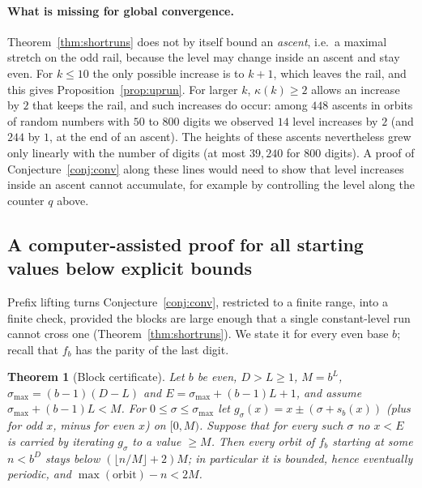 \documentclass[11pt]{article}
\newtheorem{theorem}{Theorem}[section]
\theoremstyle{definition}
\theoremstyle{remark}
\begin{document}
\paragraph{What is missing for global convergence.} Theorem~\ref{thm:shortruns}
does not by itself bound an \emph{ascent}, i.e.\ a maximal stretch on the odd
rail, because the level may change inside an ascent and stay even. For
$k\le10$ the only possible increase is to $k+1$, which leaves the rail, and
this gives Proposition~\ref{prop:uprun}. For larger $k$, $\kappa(k)\ge2$ allows
an increase by $2$ that keeps the rail, and such increases do occur: among
$448$ ascents in orbits of random numbers with $50$ to $800$ digits we
observed $14$ level increases by $2$ (and $244$ by $1$, at the end of an
ascent). The heights of these ascents nevertheless grew only linearly with
the number of digits (at most $39{,}240$ for $800$ digits). A proof of
Conjecture~\ref{conj:conv} along these lines would need to show that level
increases inside an ascent cannot accumulate, for example by controlling the
level along the counter $q$ above.

\subsection*{A computer-assisted proof for all starting values below explicit bounds}

Prefix lifting turns Conjecture~\ref{conj:conv}, restricted to a finite range,
into a finite check, provided the blocks are large enough that a single
constant-level run cannot cross one (Theorem~\ref{thm:shortruns}). We state it
for every even base $b$; recall that $f_b$ has the parity of the last digit.

\begin{theorem}[Block certificate]\label{thm:cert}
Let $b$ be even, $D>L\ge1$, $M=b^L$, $\sigma_{\max}=(b-1)(D-L)$ and
$E=\sigma_{\max}+(b-1)L+1$, and assume $\sigma_{\max}+(b-1)L<M$. For
$0\le\sigma\le\sigma_{\max}$ let $g_\sigma(x)=x\pm(\sigma+s_b(x))$ (plus for odd
$x$, minus for even $x$) on $[0,M)$. Suppose that for every such $\sigma$ no
$x<E$ is carried by iterating $g_\sigma$ to a value $\ge M$. Then every orbit of
$f_b$ starting at some $n<b^D$ stays below $(\lfloor n/M\rfloor+2)M$; in
particular it is bounded, hence eventually periodic, and
$\max(\text{orbit})-n<2M$.
\end{theorem}
\end{document}
